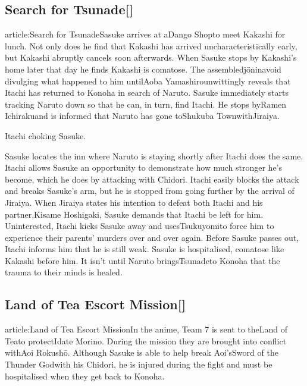 \documentclass[a4paper,12pt]{article}
\begin{document}
\subsection*{Search for Tsunade[]}\n\nMain article:Search for TsunadeSasuke arrives at aDango Shopto meet Kakashi for lunch. Not only does he find that Kakashi has arrived uncharacteristically early, but Kakashi abruptly cancels soon afterwards. When Sasuke stops by Kakashi's home later that day he finds Kakashi is comatose. The assembledjōninavoid divulging what happened to him untilAoba Yamashirounwittingly reveals that Itachi has returned to Konoha in search of Naruto. Sasuke immediately starts tracking Naruto down so that he can, in turn, find Itachi. He stops byRamen Ichirakuand is informed that Naruto has gone toShukuba TownwithJiraiya.\\ \par \vspace{0.5cm}

Itachi choking Sasuke.\\ \par \vspace{0.5cm}

Sasuke locates the inn where Naruto is staying shortly after Itachi does the same. Itachi allows Sasuke an opportunity to demonstrate how much stronger he's become, which he does by attacking with Chidori. Itachi easily blocks the attack and breaks Sasuke's arm, but he is stopped from going further by the arrival of Jiraiya. When Jiraiya states his intention to defeat both Itachi and his partner,Kisame Hoshigaki, Sasuke demands that Itachi be left for him. Uninterested, Itachi kicks Sasuke away and usesTsukuyomito force him to experience their parents' murders over and over again. Before Sasuke passes out, Itachi informs him that he is still weak. Sasuke is hospitalised, comatose like Kakashi before him. It isn't until Naruto bringsTsunadeto Konoha that the trauma to their minds is healed.\\ \par \vspace{0.5cm}

\subsection*{Land of Tea Escort Mission[]}\n\nMain article:Land of Tea Escort MissionIn the anime, Team 7 is sent to theLand of Teato protectIdate Morino. During the mission they are brought into conflict withAoi Rokushō. Although Sasuke is able to help break Aoi'sSword of the Thunder Godwith his Chidori, he is injured during the fight and must be hospitalised when they get back to Konoha.\\ \par \vspace{0.5cm}
\end{document}
